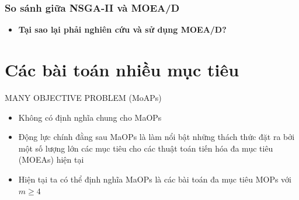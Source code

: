 \documentclass{beamer}
\begin{document}
    \begin{frame}
    \frametitle{\textbf{So sánh giữa NSGA-II và MOEA/D}}
        \begin{itemize}[label={}]
        \begin{itemize}
            \item<1-> Độ phức tạp mỗi lần chạy của MOEA/D nhỏ hơn NSGA-II.
            \item<2-> NSGA-II chỉ cần một hệ số ngoài là mật độ đột biến (mutation rate) khi chạy thuật toán.
            \item<3-> NSGA-II hội tụ tới biên Parento nhanh hơn.
            \item<4-> NSGA-II đảm bảo kích cỡ quần thể cố định $\implies$ dễ quản lý và lưu trữ hơn.
        \end{itemize}
        \item<5-> \textbf{Tại sao lại phải nghiên cứu và sử dụng MOEA/D?}
        \end{itemize}
    \end{frame}


    \section{Các bài toán nhiều mục tiêu}
    \begin{frame}{MANY OBJECTIVE PROBLEM (MoAPs)}
        \begin{itemize}
            \item <1-> Không có định nghĩa chung cho MaOPs
            \item <2-> Động lực chính đằng sau MaOPs là làm nổi bật những thách thức đặt ra bởi một số lượng lớn các mục tiêu cho các thuật toán tiến hóa đa mục tiêu (MOEAs) hiện tại
            \item <3-> Hiện tại ta có thể định nghĩa MaOPs là các bài toán đa mục tiêu MOPs với $m \geq 4$
        \end{itemize}
    \end{frame}
\end{document}
